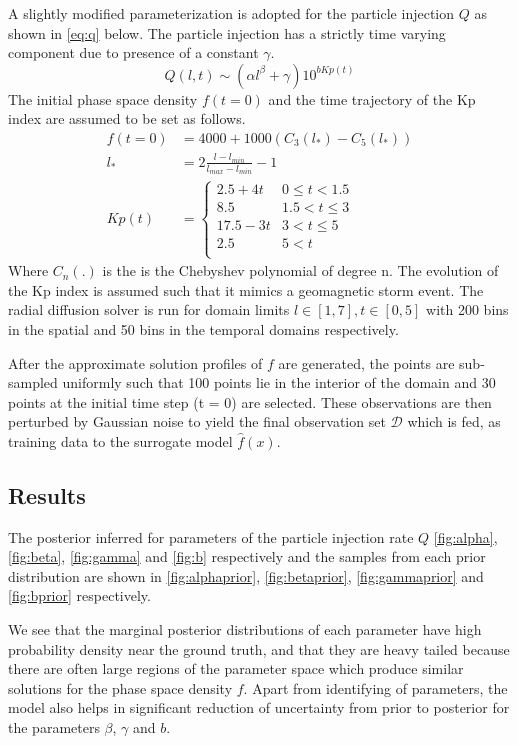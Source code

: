 A slightly modified parameterization is adopted for the particle injection $Q$ as shown in \cref{eq:q} below. The particle injection has a strictly time varying component due to presence of a constant $\gamma$.
%
\begin{equation}\label{eq:q}
Q(l,t)  \sim (\alpha l^{\beta} + \gamma) 10^{b Kp(t)}
\end{equation}
%
The initial phase space density $f(t = 0)$ and the time trajectory 
of the Kp index are assumed to be set as follows.
%
\begin{align}
f(t = 0) &= 4000 + 1000(C_{3}(l_*) - C_{5}(l_*)) \\
l_* &= 2\frac{l - l_{min}}{l_{max} - l_{min}} - 1 \\
Kp(t) &= \left\{\begin{matrix}
2.5 + 4t & 0 \leq t < 1.5\\ 
8.5 & 1.5 < t \leq 3\\ 
17.5-3t & 3 <  t \leq 5 \\ 
2.5 & 5 < t\\ 
\end{matrix}\right.
\end{align}
%
Where $C_n(.)$ is the is the Chebyshev polynomial of degree n. 
The evolution of the Kp index \citet{BartelsKp} is assumed such that it mimics a geomagnetic storm event. 
The radial diffusion solver is run for domain limits $l \in [1, 7], t \in [0, 5]$ with
200 bins in the spatial and 50 bins in the temporal domains respectively.

After the approximate solution profiles of $f$ are generated, the points are sub-sampled
uniformly such that 100 points lie in the interior of the domain and 30 points at the initial time step (t = 0) are selected. These observations are then perturbed by Gaussian noise to yield
the final observation set $\mathcal{D}$ which is fed, as training data to the surrogate model $\hat{f}(x)$.

\subsection*{Results}

The posterior inferred for parameters of the particle injection rate $Q$ \ref{fig:alpha}, 
\ref{fig:beta}, \ref{fig:gamma} and \ref{fig:b} respectively and the samples from each prior distribution are shown in \ref{fig:alphaprior}, \ref{fig:betaprior}, \ref{fig:gammaprior} and \ref{fig:bprior} respectively.

We see that the marginal posterior distributions of each parameter have high probability 
density near the ground truth, and that they are heavy tailed because there are often large 
regions of the parameter space which produce similar solutions for the phase space density $f$. 
Apart from identifying of parameters, the model also helps in significant reduction of uncertainty
from prior to posterior for the parameters $\beta$, $\gamma$ and $b$.

